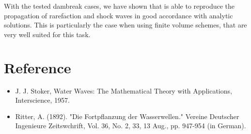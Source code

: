 With the tested dambreak cases, we have shown that  is able to reproduce the propagation
of rarefaction and shock waves in good accordance with analytic solutions. This is particularly the case when using
finite volume schemes, that are very well suited for this task. 

\section{Reference}

\begin{itemize}
\item J. J. Stoker, Water Waves: The Mathematical Theory with Applications, Interscience, 1957.
\item Ritter, A. (1892). "Die Fortpflanzung der Wasserwellen." Vereine Deutscher Ingenieure Zeitswchrift, Vol. 36, No. 2, 33, 
13 Aug., pp. 947-954 (in German).
\end{itemize}
